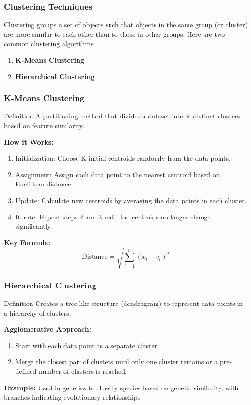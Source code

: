 \documentclass[aspectratio=169]{beamer}
\begin{document}
\begin{frame}[fragile]
    \frametitle{Clustering Techniques}
    Clustering groups a set of objects such that objects in the same group (or cluster) are more similar to each other than to those in other groups. Here are two common clustering algorithms:

    \begin{enumerate}
        \item \textbf{K-Means Clustering}
        \item \textbf{Hierarchical Clustering}
    \end{enumerate}
\end{frame}

\begin{frame}[fragile]
    \frametitle{K-Means Clustering}
    \begin{block}{Definition}
        A partitioning method that divides a dataset into K distinct clusters based on feature similarity.
    \end{block}
    
    \textbf{How it Works:}
    \begin{enumerate}
        \item Initialization: Choose K initial centroids randomly from the data points.
        \item Assignment: Assign each data point to the nearest centroid based on Euclidean distance.
        \item Update: Calculate new centroids by averaging the data points in each cluster.
        \item Iterate: Repeat steps 2 and 3 until the centroids no longer change significantly.
    \end{enumerate}

    \textbf{Key Formula:}
    \begin{equation}
        \text{Distance} = \sqrt{\sum_{i=1}^n (x_i - c_i)^2}
    \end{equation}
\end{frame}

\begin{frame}[fragile]
    \frametitle{Hierarchical Clustering}
    \begin{block}{Definition}
        Creates a tree-like structure (dendrogram) to represent data points in a hierarchy of clusters.
    \end{block}
    
    \textbf{Agglomerative Approach:}
    \begin{enumerate}
        \item Start with each data point as a separate cluster.
        \item Merge the closest pair of clusters until only one cluster remains or a pre-defined number of clusters is reached.
    \end{enumerate}

    \textbf{Example:} 
    Used in genetics to classify species based on genetic similarity, with branches indicating evolutionary relationships.
\end{frame}
\end{document}
